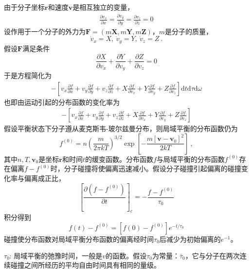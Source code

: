 \documentclass[12pt,a4paper]{article}
\renewcommand{\vec}[1]{\boldsymbol{#1}}
\newcommand{\dif}{\mathrm{d}}
\begin{document}
由于分子坐标$\vec{r}$和速度$\vec{v}$是相互独立的变量，
\begin{eqnarray*}
\frac{\partial v_x}{\partial x} = \frac{\partial v_y}{\partial y} = \frac{\partial v_z}{\partial z} = 0
\end{eqnarray*}
设作用于一个分子的外力为$\vec{F} = (m\vec{X}, m\vec{Y}, m\vec{Z})$，$m$是分子的质量，
\begin{equation}
\dot{v}_x = X, ~\dot{v}_y = Y, ~\dot{v}_z = Z ~.
\end{equation}
假设$\vec{F}$满足条件
\begin{equation}
\frac{\partial X}{\partial v_x} + \frac{\partial Y}{\partial v_y} + \frac{\partial Z}{\partial v_z} = 0
\end{equation}
于是方程简化为
\begin{eqnarray*}
-\left[v_x\frac{\partial f}{\partial x} +v_y \frac{\partial f}{\partial y} +v_z \frac{\partial f}{\partial z} +X \frac{\partial f}{\partial v_x} +Y \frac{\partial f}{\partial v_y} +Z \frac{\partial f}{\partial v_z}  \right] \dif t \dif \tau \dif \omega
\end{eqnarray*}
也即由运动引起的分布函数的变化率为
\begin{eqnarray*}
-\left[v_x\frac{\partial f}{\partial x} +v_y \frac{\partial f}{\partial y} +v_z \frac{\partial f}{\partial z} +X \frac{\partial f}{\partial v_x} +Y \frac{\partial f}{\partial v_y} +Z \frac{\partial f}{\partial v_z}  \right] 
\end{eqnarray*}
假设平衡状态下分子遵从麦克斯韦-玻尔兹曼分布，则局域平衡的分布函数仍为
\begin{equation}
f^{(0)}= n \left(\frac{m}{2\pi k T} \right)^{3/2} \exp \left[-\frac{m[\vec{v} -\vec{v}_0]^2}{2k T} \right] ~,
\end{equation}
其中$n, T, \vec{v}_0$是坐标$\vec{r}$和时间$t$的缓变函数。分布函数$f$与局域平衡的分布函数$f^{(0)}$存在偏离$f-f^{(0)}$时，分子碰撞将使偏离迅速减小。假设分子碰撞引起偏离的碰撞变化率与偏离成正比，
\begin{equation}
\left[\frac{\partial (f-f^{(0)} )}{\partial t} \right]_c = -\frac{f-f^{(0)} }{\tau_0}
\end{equation}
积分得到
\begin{equation}
f(t) -f^{(0)} = [f(0) -f^{(0)}] e^{-t/\tau_0}
\end{equation}
碰撞使分布函数对局域平衡分布函数的偏离经时间$\tau_0$后减少为初始偏离的$e^{-1}$。

$\tau_0$: 局域平衡的弛豫时间，一般是$v$的函数。假设$\tau_0$为常量：$\bar{\tau}_0$，它与分子在两次连续碰撞之间所经历的平均自由时间具有相同的量级。
\end{document}
